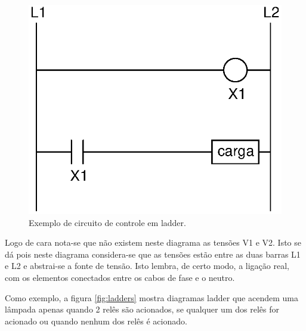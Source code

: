 \begin{figure}[!h]
  \centering
  \includegraphics[scale=0.6]{figuras/ladder1} %
  \caption{Exemplo de circuito de controle em ladder.}
  \label{fig:ladder1}
\end{figure}

Logo de cara nota-se que não existem neste diagrama as tensões V1 e V2. Isto se dá pois neste diagrama considera-se que as tensões estão entre as duas barras L1 e L2 e abstrai-se a fonte de tensão. Isto lembra, de certo modo, a ligação real, com os elementos conectados entre os cabos de fase e o neutro.


Como exemplo, a figura \ref{fig:ladders} mostra diagramas ladder que acendem uma lâmpada apenas quando 2 relês são acionados, se qualquer um dos relês for acionado ou quando nenhum dos relês é acionado.

